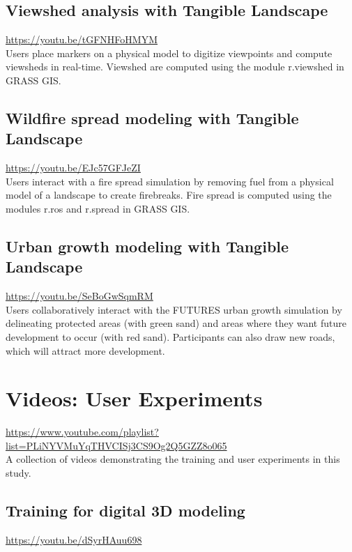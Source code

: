 \documentclass[prodmode,acmtochi]{acmsmall} %
\begin{document}
\subsection{Viewshed analysis with Tangible Landscape}\label{videos:viewshed}
\url{https://youtu.be/tGFNHFoHMYM}\\

\noindent
Users place markers on a physical model to digitize viewpoints and compute viewsheds in real-time. Viewshed are computed using the module r.viewshed in GRASS GIS.

\subsection{Wildfire spread modeling with Tangible Landscape}\label{videos:fire}
\url{https://youtu.be/EJc57GFJeZI}\\

\noindent
Users interact with a fire spread simulation by removing fuel from a physical model of a landscape to create firebreaks. Fire spread is computed using the modules r.ros and r.spread in GRASS GIS.

\subsection{Urban growth modeling with Tangible Landscape}\label{videos:urban}
\url{https://youtu.be/SeBoGwSqmRM}\\

\noindent
Users collaboratively interact with the FUTURES urban growth simulation by delineating protected areas (with green sand) and areas where they want future development to occur (with red sand). Participants can also draw new roads, which will attract more development.

\vfill

\clearpage

\section{Videos: User Experiments}\label{appendix:experiment_videos}
\url{https://www.youtube.com/playlist?list=PLiNYVMuYqTHVCISj3CS9Og2Q5GZZ8o065}\\

\noindent
A collection of videos demonstrating 
the training and user experiments in this study. 

\subsection{Training for digital 3D modeling}\label{videos:training}
\url{https://youtu.be/dSyrHAuu698}
\end{document}
